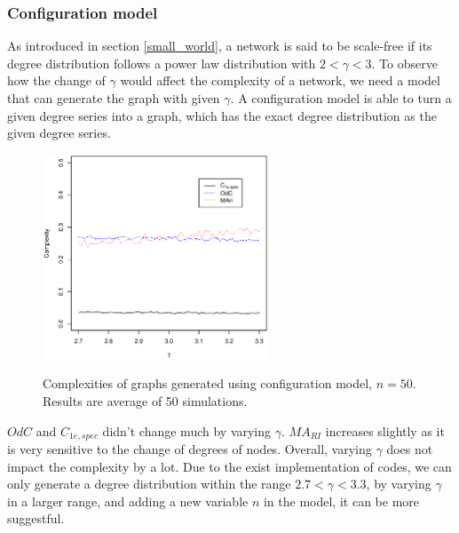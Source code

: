 \documentclass[12pt]{article}
\begin{document}
\subsubsection{Configuration model}
\label{configuration_model}
As introduced in section \ref{small_world}, a network is said to be scale-free if its degree distribution follows a power law distribution with $2<\gamma <3$. To observe how the change of $\gamma$ would affect the complexity of a network, we need a model that can generate the graph with given $\gamma$. A configuration model \cite{newmanbook} is able to turn a given degree series into a graph, which has the exact degree distribution as the given degree series. 
\begin{figure}[h]
    \centering
    \includegraphics[width=0.6\textwidth]{configuration_model.eps}
    \label{fig:configuration_model}
    \caption{Complexities of graphs generated using configuration model, $n=50$. Results are average of 50 simulations.}
\end{figure}
\noindent
$OdC$ and $C_{1e,spec}$ didn't change much by varying $\gamma$. $MA_{RI}$ increases slightly as it is very sensitive to the change of degrees of nodes. Overall, varying $\gamma$ does not impact the complexity by a lot. Due to the exist implementation of codes, we can only generate a degree distribution within the range $2.7<\gamma<3.3$, by varying $\gamma$ in a larger range, and adding a new variable $n$ in the model, it can be more suggestful. 
\end{document}
